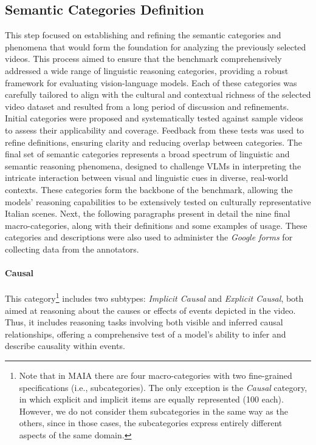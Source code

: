 \subsection{Semantic Categories Definition}
\label{subsec:Categories}
This step focused on establishing and refining the semantic categories and phenomena that would form the foundation for analyzing the previously selected videos. This process aimed to ensure that the benchmark comprehensively addressed a wide range of linguistic reasoning categories, providing a robust framework for evaluating vision-language models.
Each of these categories was carefully tailored to align with the cultural and contextual richness of the selected video dataset and resulted from a long period of discussion and refinements. Initial categories were proposed and systematically tested against sample videos to assess their applicability and coverage. Feedback from these tests was used to refine definitions, ensuring clarity and reducing overlap between categories. The final set of semantic categories represents a broad spectrum of linguistic and semantic reasoning phenomena, designed to challenge VLMs in interpreting the intricate interaction between visual and linguistic cues in diverse, real-world contexts. These categories form the backbone of the benchmark, allowing the models' reasoning capabilities to be extensively tested on culturally representative Italian scenes.
Next, the following paragraphs present in detail the nine final macro-categories, along with their definitions and some examples of usage. These categories and descriptions were also used to administer the \textit{Google forms} for collecting data from the annotators.
\paragraph{{\textbf{Causal}}}
This category\footnote{Note that in MAIA there are four macro-categories with two fine-grained specifications (i.e., subcategories). The only exception is the \textit{Causal} category, in which explicit and implicit items are equally represented (100 each). However, we do not consider them subcategories in the same way as the others, since in those cases, the subcategories express entirely different aspects of the same domain.} includes two subtypes: \textit{Implicit Causal} and \textit{Explicit Causal}, both aimed at reasoning about the causes or effects of events depicted in the video. Thus, it includes reasoning tasks involving both visible and inferred causal relationships, offering a comprehensive test of a model's ability to infer and describe causality within events.


